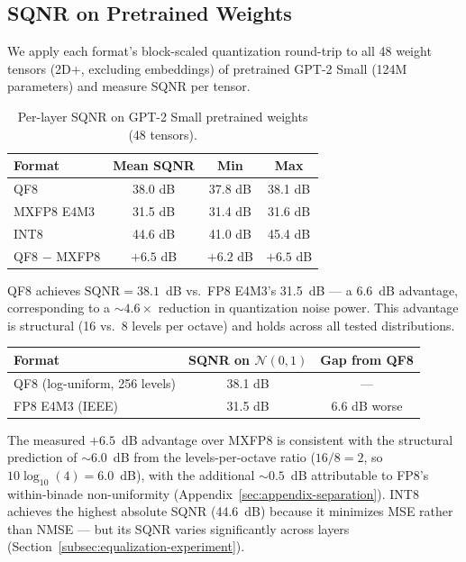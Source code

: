 \documentclass[11pt,letterpaper]{article}
\theoremstyle{definition}
\theoremstyle{remark}
\newcommand{\SQNR}{\mathrm{SQNR}}
\begin{document}
\subsection{SQNR on Pretrained Weights}
\label{subsec:sqnr-pretrained}

We apply each format's block-scaled quantization round-trip to all 48 weight
tensors (2D+, excluding embeddings) of pretrained GPT-2 Small (124M parameters)
and measure SQNR per tensor.

\begin{table}[ht]
\centering
\caption{Per-layer SQNR on GPT-2 Small pretrained weights (48 tensors).}
\label{tab:sqnr-pretrained}
\begin{tabular}{@{}lccc@{}}
\toprule
Format & Mean SQNR & Min & Max \\
\midrule
QF8         & 38.0 dB & 37.8 dB & 38.1 dB \\
MXFP8 E4M3 & 31.5 dB & 31.4 dB & 31.6 dB \\
INT8        & 44.6 dB & 41.0 dB & 45.4 dB \\
\midrule
QF8 $-$ MXFP8 & $+6.5$ dB & $+6.2$ dB & $+6.5$ dB \\
\bottomrule
\end{tabular}
\end{table}

\begin{keyresult}
QF8 achieves $\SQNR = 38.1$~dB vs.\ FP8 E4M3's 31.5~dB ---
a $6.6$~dB advantage, corresponding to a ${\sim}4.6\times$ reduction in
quantization noise power.
This advantage is structural (16 vs.\ 8 levels per octave) and holds across all
tested distributions.

\medskip
\begin{tabular}{@{}lcc@{}}
\toprule
Format & SQNR on $\mathcal{N}(0,1)$ & Gap from QF8 \\
\midrule
QF8 (log-uniform, 256 levels) & 38.1 dB & --- \\
FP8 E4M3 (IEEE)               & 31.5 dB & 6.6 dB worse \\
\bottomrule
\end{tabular}
\end{keyresult}

The measured $+6.5$~dB advantage over MXFP8 is consistent with the structural
prediction of ${\sim}6.0$~dB from the levels-per-octave ratio
($16/8 = 2$, so $10\log_{10}(4) = 6.0$~dB), with the additional
${\sim}0.5$~dB attributable to FP8's within-binade non-uniformity
(Appendix~\ref{sec:appendix-separation}).
INT8 achieves the highest absolute SQNR (44.6~dB) because it minimizes MSE
rather than NMSE --- but its SQNR varies significantly across layers
(Section~\ref{subsec:equalization-experiment}).
\end{document}
